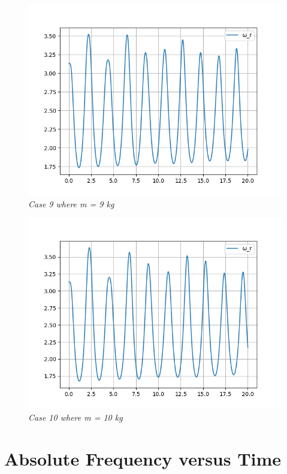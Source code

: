         \begin{figure}[H]
            \centering
            \includegraphics{Appendix/RSimPictures/F/fm9.png}
            \caption{\textit{Case 9 where m = 9 kg}}
            \label{}
        \end{figure}
            
        \begin{figure}[H]
            \centering
            \includegraphics{Appendix/RSimPictures/F/fm10.png}
            \caption{\textit{Case 10 where m = 10 kg}}
            \label{}
        \end{figure}
            
    \section{{Absolute Frequency versus Time}}
            
